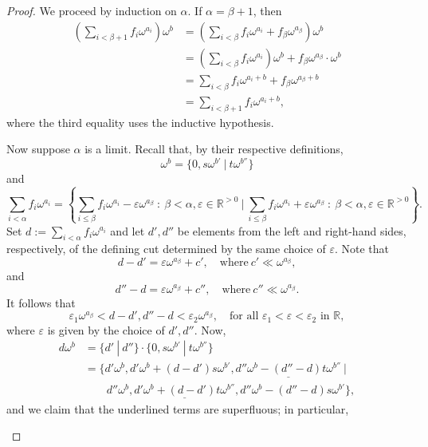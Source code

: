 \begin{proof} We proceed by induction on $\alpha$.  If $\alpha=\beta +1$, then
\begin{align*}\left ( \sum_{i<\beta + 1} f_i\omega^{a_i} \right ) \omega^b 
	&= \left ( \sum_{i<\beta} f_i\omega^{a_i} + f_\beta \omega^{a_\beta} \right )\omega^b \\
	& = \left ( \sum_{i<\beta} f_i\omega^{a_i}\right ) \omega^b + f_\beta \omega^{a_\beta}\cdot \omega^b \\
	& = \sum_{i<\beta}f_i\omega^{a_i+b} + f_\beta\omega^{a_\beta+b} \\
	& = \sum_{i<\beta+1}f_i\omega^{a_i+b}, \end{align*}
where the third equality uses the inductive hypothesis.  

Now suppose $\alpha$ is a limit.  Recall that, by their respective definitions,
$$\omega^b=\{0, s\omega^{b'} \ | \ t\omega^{b''}\}$$
and
$$\sum_{i<\alpha}f_i\omega^{a_i} = \left \{ \sum_{i\leq \beta} f_i\omega^{a_i} - \varepsilon \omega^{a_\beta} \ : \ \beta<\alpha, \varepsilon\in \mathds{R}^{>0} \ \biggl | \  \sum_{i\leq \beta} f_i\omega^{a_i} + \varepsilon \omega^{a_\beta} \ : \ \beta<\alpha, \varepsilon\in \mathds{R}^{>0}\right \}.$$
Set $d:=\sum_{i<\alpha}f_i\omega^{a_i}$ and let $d', d''$ be elements from the left and right-hand sides, respectively, of the defining cut determined by the same choice of $\varepsilon$.  Note that
$$d-d' = \varepsilon \omega^{a_\beta} + c', \quad \text{where} \ c'\ll \omega^{a_\beta},$$
and
$$d''-d = \varepsilon \omega^{a_\beta} + c'', \quad \text{where} \ c''\ll \omega^{a_\beta}.$$	
It follows that
\begin{equation}\varepsilon_1\omega^{a_\beta}<d-d', d''-d<\varepsilon_2\omega^{a_\beta}, \quad \text{for all $\varepsilon_1<\varepsilon<\varepsilon_2$ in $\mathds{R}$}, \tag{$*$}\end{equation}
where $\varepsilon$ is given by the choice of $d', d''$.  Now,
\begin{align*} d\omega^b & = \{d' \ | \ d''\} \cdot \{0, s\omega^{b'} \ | \ t\omega^{b''}\} \\
			& = \{d'\omega^b, d' \omega^b+(d-d')s\omega^{b'}, \underline{d''\omega^b-(d''-d)t\omega^{b''}} \ | \\
			& \qquad  d''\omega^b, \underline{d'\omega^b+(d-d')t\omega^{b''}}, d''\omega^b-(d''-d)s\omega^{b'}\},\end{align*}
and we claim that the underlined terms are superfluous; in particular, 
\begin{enumerate}[(1)]

\end{enumerate}
\end{proof}
